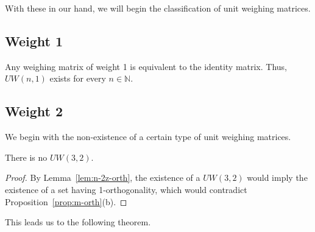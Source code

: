 With these in our hand, we will begin the classification of unit weighing matrices.

\subsection{Weight 1}
\label{subsec:w1}

Any weighing matrix of weight 1 is equivalent to the identity matrix. Thus, $UW(n,1)$ exists for every $n \in \mathbb{N}$.

\subsection{Weight 2}
\label{subsec:w2}

We begin with the non-existence of a certain type of unit weighing matrices.

\begin{lemma}\label{lem:cw-3-2}
 There is no $UW(3,2)$.
\begin{proof}
By Lemma~\ref{lem:n-2z-orth}, the existence of a $UW(3,2)$ would imply the existence of a set having 1-orthogonality, which would contradict Proposition~\ref{prop:m-orth}(b).
\end{proof}
\end{lemma}

This leads us to the following theorem.

